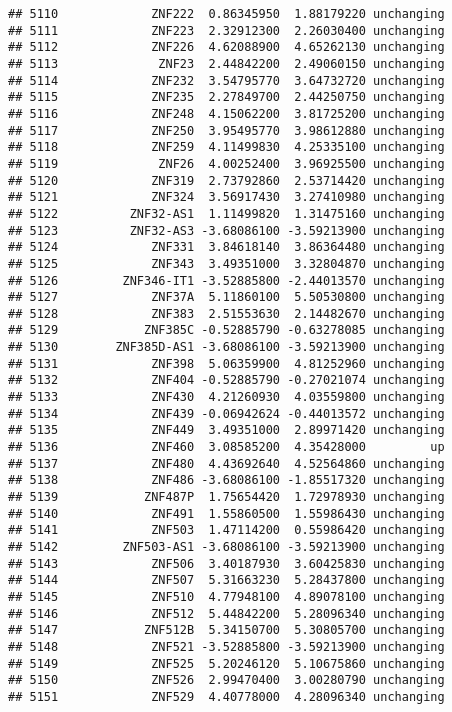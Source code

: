 \documentclass[]{article}
\begin{document}
\begin{verbatim}
## 5110             ZNF222  0.86345950  1.88179220 unchanging
## 5111             ZNF223  2.32912300  2.26030400 unchanging
## 5112             ZNF226  4.62088900  4.65262130 unchanging
## 5113              ZNF23  2.44842200  2.49060150 unchanging
## 5114             ZNF232  3.54795770  3.64732720 unchanging
## 5115             ZNF235  2.27849700  2.44250750 unchanging
## 5116             ZNF248  4.15062200  3.81725200 unchanging
## 5117             ZNF250  3.95495770  3.98612880 unchanging
## 5118             ZNF259  4.11499830  4.25335100 unchanging
## 5119              ZNF26  4.00252400  3.96925500 unchanging
## 5120             ZNF319  2.73792860  2.53714420 unchanging
## 5121             ZNF324  3.56917430  3.27410980 unchanging
## 5122          ZNF32-AS1  1.11499820  1.31475160 unchanging
## 5123          ZNF32-AS3 -3.68086100 -3.59213900 unchanging
## 5124             ZNF331  3.84618140  3.86364480 unchanging
## 5125             ZNF343  3.49351000  3.32804870 unchanging
## 5126         ZNF346-IT1 -3.52885800 -2.44013570 unchanging
## 5127             ZNF37A  5.11860100  5.50530800 unchanging
## 5128             ZNF383  2.51553630  2.14482670 unchanging
## 5129            ZNF385C -0.52885790 -0.63278085 unchanging
## 5130        ZNF385D-AS1 -3.68086100 -3.59213900 unchanging
## 5131             ZNF398  5.06359900  4.81252960 unchanging
## 5132             ZNF404 -0.52885790 -0.27021074 unchanging
## 5133             ZNF430  4.21260930  4.03559800 unchanging
## 5134             ZNF439 -0.06942624 -0.44013572 unchanging
## 5135             ZNF449  3.49351000  2.89971420 unchanging
## 5136             ZNF460  3.08585200  4.35428000         up
## 5137             ZNF480  4.43692640  4.52564860 unchanging
## 5138             ZNF486 -3.68086100 -1.85517320 unchanging
## 5139            ZNF487P  1.75654420  1.72978930 unchanging
## 5140             ZNF491  1.55860500  1.55986430 unchanging
## 5141             ZNF503  1.47114200  0.55986420 unchanging
## 5142         ZNF503-AS1 -3.68086100 -3.59213900 unchanging
## 5143             ZNF506  3.40187930  3.60425830 unchanging
## 5144             ZNF507  5.31663230  5.28437800 unchanging
## 5145             ZNF510  4.77948100  4.89078100 unchanging
## 5146             ZNF512  5.44842200  5.28096340 unchanging
## 5147            ZNF512B  5.34150700  5.30805700 unchanging
## 5148             ZNF521 -3.52885800 -3.59213900 unchanging
## 5149             ZNF525  5.20246120  5.10675860 unchanging
## 5150             ZNF526  2.99470400  3.00280790 unchanging
## 5151             ZNF529  4.40778000  4.28096340 unchanging

\end{verbatim}
\end{document}
